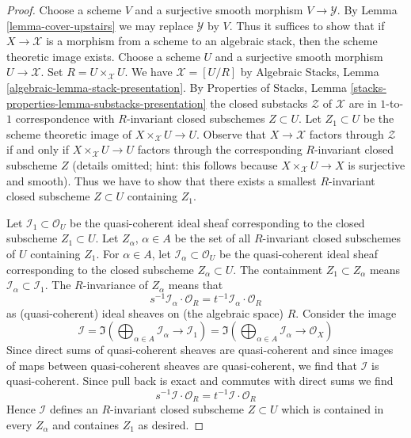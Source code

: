 \begin{proof}
Choose a scheme $V$ and a surjective smooth morphism $V \to \mathcal{Y}$.
By Lemma \ref{lemma-cover-upstairs} we may replace $\mathcal{Y}$ by $V$.
Thus it suffices to show that if $X \to \mathcal{X}$ is a morphism from
a scheme to an algebraic stack, then the scheme theoretic image exists.
Choose a scheme $U$ and a surjective smooth morphism $U \to \mathcal{X}$.
Set $R = U \times_\mathcal{X} U$.
We have $\mathcal{X} = [U/R]$ by
Algebraic Stacks, Lemma \ref{algebraic-lemma-stack-presentation}.
By Properties of Stacks, Lemma
\ref{stacks-properties-lemma-substacks-presentation}
the closed substacks $\mathcal{Z}$ of $\mathcal{X}$
are in $1$-to-$1$ correspondence with $R$-invariant
closed subschemes $Z \subset U$.
Let $Z_1 \subset U$ be the scheme theoretic image of
$X \times_\mathcal{X} U \to U$.
Observe that $X \to \mathcal{X}$ factors through $\mathcal{Z}$
if and only if $X \times_\mathcal{X} U \to U$ factors through
the corresponding $R$-invariant closed subscheme $Z$
(details omitted; hint: this follows because
$X \times_\mathcal{X} U \to X$ is surjective and smooth).
Thus we have to show that there exists a smallest $R$-invariant
closed subscheme $Z \subset U$ containing $Z_1$.

\medskip\noindent
Let $\mathcal{I}_1 \subset \mathcal{O}_U$ be the quasi-coherent
ideal sheaf corresponding to the closed subscheme $Z_1 \subset U$.
Let $Z_\alpha$, $\alpha \in A$ be the set of all $R$-invariant
closed subschemes of $U$ containing $Z_1$.
For $\alpha \in A$, let $\mathcal{I}_\alpha \subset \mathcal{O}_U$
be the quasi-coherent ideal sheaf corresponding to the closed subscheme
$Z_\alpha \subset U$. The containment $Z_1 \subset Z_\alpha$
means $\mathcal{I}_\alpha \subset \mathcal{I}_1$.
The $R$-invariance of $Z_\alpha$ means that
$$
s^{-1}\mathcal{I}_\alpha \cdot \mathcal{O}_R =
t^{-1}\mathcal{I}_\alpha \cdot \mathcal{O}_R
$$
as (quasi-coherent) ideal sheaves on (the algebraic space) $R$.
Consider the image
$$
\mathcal{I} =
\Im\left(
\bigoplus\nolimits_{\alpha \in A} \mathcal{I}_\alpha \to \mathcal{I}_1
\right) =
\Im\left(
\bigoplus\nolimits_{\alpha \in A} \mathcal{I}_\alpha \to \mathcal{O}_X
\right)
$$
Since direct sums of quasi-coherent sheaves are quasi-coherent
and since images of maps between quasi-coherent sheaves are
quasi-coherent, we find that $\mathcal{I}$ is quasi-coherent.
Since pull back is exact and commutes with direct sums we find
$$
s^{-1}\mathcal{I} \cdot \mathcal{O}_R =
t^{-1}\mathcal{I} \cdot \mathcal{O}_R
$$
Hence $\mathcal{I}$ defines an $R$-invariant closed subscheme
$Z \subset U$ which is contained in every $Z_\alpha$ and containes
$Z_1$ as desired.
\end{proof}

